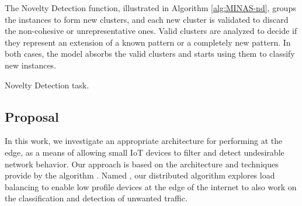 The Novelty Detection function, illustrated in Algorithm \ref{alg:MINAS-nd},
groups the instances to form new clusters, and each new cluster is validated to
discard the non-cohesive or unrepresentative ones.
Valid clusters are analyzed to decide if they represent an extension of a
known pattern or a completely new pattern. In both cases, the model absorbs the
valid clusters and starts using them to classify new instances.

\begin{algorithm}[htb]
    \KwParams{\minExamplesPerCluster, \noveltyFactor}
    \caption{\minas \cite{Faria2015minas} Novelty Detection task.}
    \label{alg:MINAS-nd}
\end{algorithm}

\subsection{Proposal}
\label{sec:prop}

In this work, we investigate an appropriate architecture for performing \nd at
the edge, as a means of allowing small IoT devices to filter and detect undesirable
network behavior.
Our approach is based on the \arch architecture \cite{Cassales2019a} and \nd
techniques provide by the \minas algorithm \cite{Faria2015minas}.
Named \mfog, our distributed algorithm explores load balancing to enable low
profile devices at the edge of the internet to also work on the classification
and detection of unwanted traffic.

